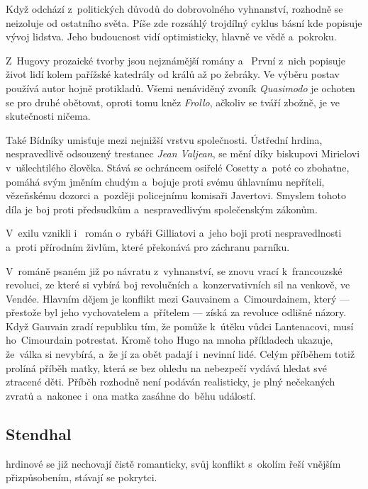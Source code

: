 Když odchází z~politických důvodů do dobrovolného vyhnanství, rozhodně
se neizoluje od ostatního světa. Píše zde rozsáhlý trojdílný cyklus
básní  kde popisuje vývoj lidstva. Jeho budoucnost
vidí optimisticky, hlavně ve vědě a~pokroku.

Z~Hugovy prozaické tvorby jsou nejznámější romány  a~ První z~nich popisuje život lidí kolem
pařížské katedrály od králů až po žebráky. Ve výběru postav používá
autor hojně protikladů. Všemi nenáviděný zvoník \emph{Quasimodo} je
ochoten se pro druhé obětovat, oproti tomu kněz \emph{Frollo}, ačkoliv
se tváří zbožně, je ve skutečnosti ničema.

Také Bídníky umisťuje mezi nejnižší vrstvu společnosti. Ústřední hrdina,
nespravedlivě odsouzený trestanec \emph{Jean Valjean}, se mění díky
biskupovi Mirielovi v~ušlechtilého člověka. Stává se ochráncem osiřelé
Cosetty a~poté co zbohatne, pomáhá svým jměním chudým a~bojuje proti
svému úhlavnímu nepříteli, vězeňskému dozorci a~později policejnímu
komisaři Javertovi. Smyslem tohoto díla je boj proti předsudkům
a~nespravedlivým společenským zákonům.

V~exilu vznikli i~ román o~rybáři Gilliatovi a~jeho
boji proti nespravedlnosti a~proti přírodním živlům, které překonává pro
záchranu parníku.

V~románě  psaném již po návratu z~vyhnanství, se
znovu vrací k~francouzské revoluci, ze které si vybírá boj revolučních
a~konzervativních sil na venkově, ve Vendée. Hlavním dějem je konflikt
mezi Gauvainem a~Cimourdainem, který --- přestože byl jeho vychovatelem
a~přítelem --- získá za revoluce odlišné názory. Když Gauvain zradí
republiku tím, že pomůže k~útěku vůdci  Lantenacovi, musí
ho~Cimourdain potrestat. Kromě toho Hugo na mnoha příkladech ukazuje,
že~válka si nevybírá, a~že jí za obět padají i~nevinní lidé. Celým
příběhem totiž prolíná příběh matky, která se bez ohledu na nebezpečí
vydává hledat své ztracené děti. Příběh rozhodně není podáván
realisticky, je plný nečekaných zvratů a~nakonec i~ona matka zasáhne
do~běhu událostí.

\subsection*{Stendhal}
 hrdinové se již nechovají čistě
romanticky, svůj konflikt s~okolím řeší vnějším přizpůsobením, stávají
se pokrytci.

